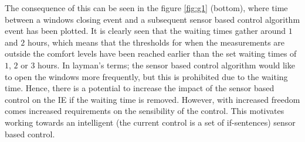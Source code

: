 \documentclass[fleqn,usenatbib,nofootinbib]{revtex4-2}
\begin{document}
	The consequence of this can be seen in the figure \ref{fig:g1} (bottom), where time between a windows closing event and a subsequent sensor based control algorithm event has been plotted. It is clearly seen that the waiting times gather around $1$ and $2$ hours, which means that the thresholds for when the measurements are outside the comfort levels have been reached earlier than the set waiting times of $1$, $2$ or $3$ hours. In layman's terms; the sensor based control algorithm would like to open the windows more frequently, but this is prohibited due to the waiting time. Hence, there is a potential to increase the impact of the sensor based control on the IE if the waiting time is removed. However, with increased freedom comes increased requirements on the sensibility of the control. This motivates working towards an intelligent (the current control is a set of if-sentences) sensor based control. 
	\newpage
	
\end{document}
